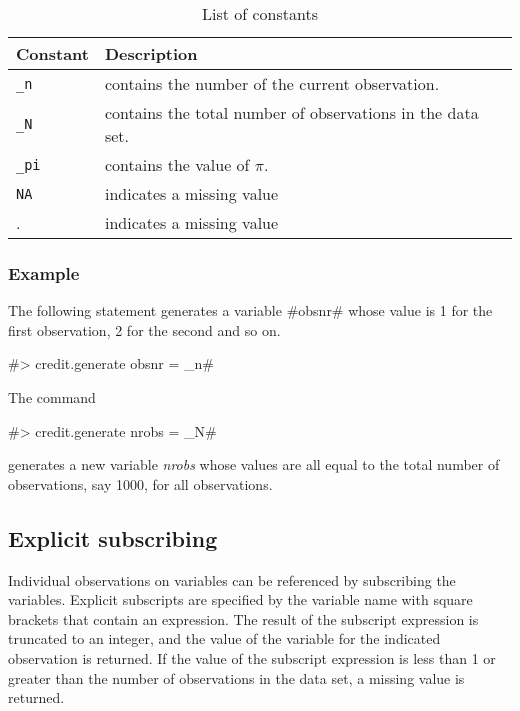 \begin{table}[ht]
\begin{center}
\begin{tabular}{|l|l|}
\hline
Constant & Description \\
\hline \hline
\texttt{\_n} & contains the number of the current observation.  \\
\texttt{\_N }& contains the total number of observations in the data set. \\
\texttt{\_pi} & contains the value of $\pi$. \\
\texttt{NA} & indicates a missing value \\
.  & indicates a missing value \\

\hline
\end{tabular}
{\em \caption{\label{constant} List of constants}}
\end{center}
\end{table}


\subsubsection*{Example}

The following statement generates a variable #obsnr# whose value
is 1 for the first observation, 2 for the second and so on.

#> credit.generate obsnr = _n#

The command

#> credit.generate nrobs = _N#

generates a new variable {\em nrobs} whose values are all equal to
the total number of observations, say 1000, for all observations.

\subsection{Explicit subscribing}
 

Individual observations on variables can be referenced by
subscribing the variables. Explicit subscripts are specified by
the variable name with square brackets that contain an expression.
The result of the subscript expression is truncated to an integer,
and the value of the variable for the indicated observation is
returned. If  the value of the subscript expression is less than 1
or greater than the number of observations in the data set,
a missing value is returned.

